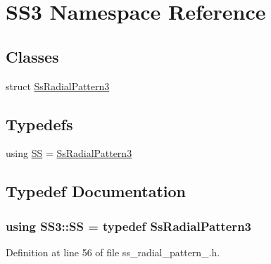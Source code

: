 \hypertarget{namespaceSS3}{}\section{S\+S3 Namespace Reference}
\label{namespaceSS3}
\subsection*{Classes}
\begin{DoxyCompactItemize}
\item 
struct \hyperlink{structSS3_1_1SsRadialPattern3}{Ss\+Radial\+Pattern3}
\end{DoxyCompactItemize}
\subsection*{Typedefs}
\begin{DoxyCompactItemize}
\item 
using \hyperlink{namespaceSS3_a795e8c1f528ebea797f616d5c8f93791}{SS} = \hyperlink{structSS3_1_1SsRadialPattern3}{Ss\+Radial\+Pattern3}
\end{DoxyCompactItemize}


\subsection{Typedef Documentation}
\subsubsection[{\texorpdfstring{SS}{SS}}]{\setlength{\rightskip}{0pt plus 5cm}using {\bf S\+S3\+::\+SS} = typedef {\bf Ss\+Radial\+Pattern3}}\hypertarget{namespaceSS3_a795e8c1f528ebea797f616d5c8f93791}{}\label{namespaceSS3_a795e8c1f528ebea797f616d5c8f93791}


Definition at line 56 of file ss\+\_\+radial\+\_\+pattern\+\_.\+h.

